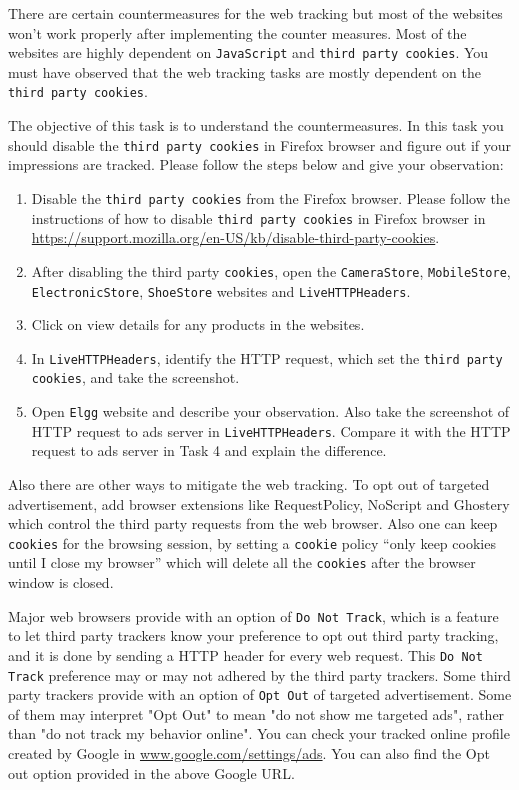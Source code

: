 There are certain countermeasures for the web tracking but most of the websites won’t work properly after implementing the counter measures. 
Most of the websites are highly dependent on {\tt JavaScript} and {\tt third party cookies}. 
You must have observed that the web tracking tasks are mostly dependent on the {\tt third party cookies}.

The objective of this task is to understand the countermeasures. 
In this task you should disable the {\tt third party cookies} in Firefox browser and figure out if your impressions are tracked. 
Please follow the steps below and give your observation:

\begin{enumerate}
  \item Disable the {\tt third party cookies} from the Firefox browser. Please follow the instructions of how to disable {\tt third party cookies} in Firefox browser in \url{https://support.mozilla.org/en-US/kb/disable-third-party-cookies}.
  \item After disabling the third party {\tt cookies}, open the {\tt CameraStore}, {\tt MobileStore}, {\tt ElectronicStore}, {\tt ShoeStore} websites and {\tt LiveHTTPHeaders}.
  \item Click on view details for any products in the websites.
  \item In {\tt LiveHTTPHeaders}, identify the HTTP request, which set the {\tt third party cookies}, and take the screenshot.
  \item Open {\tt Elgg} website and describe your observation. Also take the screenshot of HTTP request to ads server in {\tt LiveHTTPHeaders}. Compare it with the HTTP request to ads server in Task 4 and explain the difference.

\end{enumerate}

Also there are other ways to mitigate the web tracking. To opt out of targeted advertisement, 
add browser extensions like RequestPolicy, NoScript and Ghostery which control the third party requests from the web browser. 
Also one can keep {\tt cookies} for the browsing session, by setting a {\tt cookie} policy “only keep cookies until I close my browser” 
which will delete all the {\tt cookies} after the browser window is closed. 

Major web browsers provide with an option of {\tt Do Not Track}, which is a feature to let third party trackers know your preference to opt out third party tracking, 
and it is done by sending a HTTP header for every web request. 
This {\tt Do Not Track} preference may or may not adhered by the third party trackers. 
Some third party trackers provide with an option of {\tt Opt Out} of targeted advertisement. 
Some of them may interpret "Opt Out" to mean "do not show me targeted ads", rather than "do not track my behavior online". 
You can check your tracked online profile created by Google in \url{www.google.com/settings/ads}. 
You can also find the Opt out option provided in the above Google URL.

